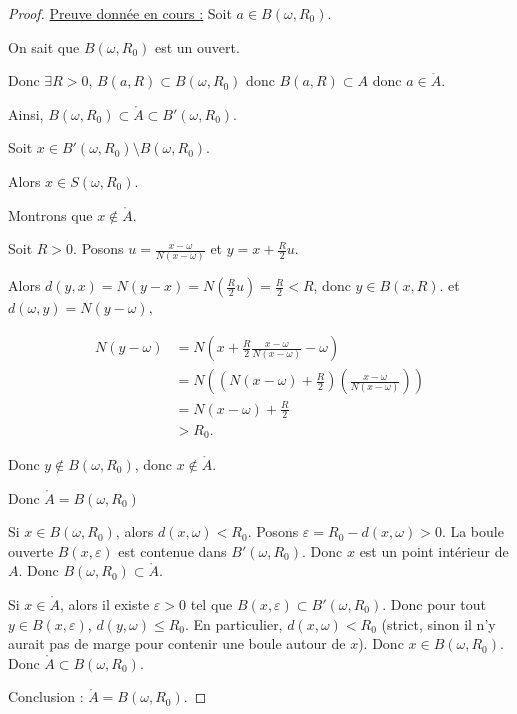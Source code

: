 \begin{proof}

    \uline{Preuve donnée en cours :}
    Soit $a \in B(\omega, R_0)$. 

    On sait que $B(\omega, R_0)$ est un ouvert. 

    Donc $\exists R > 0, \, B(a, R) \subset B(\omega, R_0)$ 
    donc $B(a, R) \subset A$ donc $a \in \mathring{A}$.

    Ainsi, $B(\omega, R_0) \subset \mathring{A} \subset B'(\omega, R_0)$.

    Soit $x \in B'(\omega, R_0) \setminus B(\omega, R_0)$.

    Alors $x \in S(\omega, R_0)$. 

    Montrons que $x \not \in \mathring A$. 

    Soit $R > 0$. Posons $u = \frac{x - \omega}{N(x - \omega)}$ et $y = x + \frac R 2 u$.

    Alors $d(y, x) = N(y - x) = N\left( \frac R 2 u \right) = \frac R 2 < R$, donc $y \in B(x, R)$.
    et $d(\omega, y) = N(y - \omega)$, 

    \begin{align*}
        N(y - \omega) & = N\left(x + \frac R 2 \frac{x - \omega}{N(x - \omega)} - \omega\right) \\
        & = N\left( \left( N(x - \omega) + \frac R 2 \right) \left( \frac{x - \omega}{N(x - \omega)}\right) \right) \\
        & = N(x - \omega) + \frac R 2 \\
        & > R_0.
    \end{align*}

    Donc $y \not \in B(\omega, R_0)$, donc $x \not \in \mathring A$.

    Donc $\mathring A = B(\omega, R_0)$


    Si \( x \in B(\omega, R_0) \), alors \( d(x, \omega) < R_0 \).
    Posons \( \varepsilon = R_0 - d(x, \omega) > 0 \).
    La boule ouverte \( B(x, \varepsilon) \) est contenue dans \( B'(\omega, R_0) \).
    Donc \( x \) est un point intérieur de \( A \).
    Donc \( B(\omega, R_0) \subset \mathring{A} \).

    Si \( x \in \mathring{A} \), alors il existe \( \varepsilon > 0 \) tel que
    \( B(x, \varepsilon) \subset B'(\omega, R_0) \).
    Donc pour tout \( y \in B(x, \varepsilon) \), \( d(y, \omega) \leq R_0 \).
    En particulier, \( d(x, \omega) < R_0 \) (strict, sinon il n'y aurait pas de marge pour contenir une boule autour de \( x \)).
    Donc \( x \in B(\omega, R_0) \).
    Donc \( \mathring{A} \subset B(\omega, R_0) \).

    Conclusion :
    \( \mathring{A} = B(\omega, R_0) \).
\end{proof}


